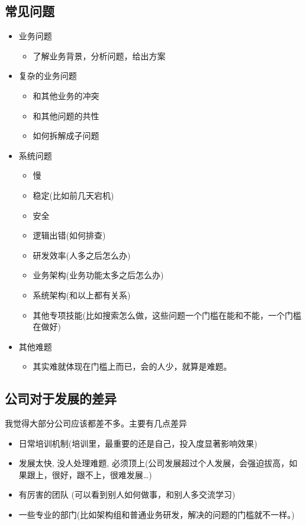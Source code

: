 \documentclass[11pt,a4paper]{article}
\begin{document}
\subsection{常见问题}
\label{sec:org972ca76}
\begin{itemize}
\item 业务问题
\begin{itemize}
\item 了解业务背景，分析问题，给出方案
\end{itemize}
\item 复杂的业务问题
\begin{itemize}
\item 和其他业务的冲突
\item 和其他问题的共性
\item 如何拆解成子问题
\end{itemize}
\item 系统问题
\begin{itemize}
\item 慢
\item 稳定(比如前几天宕机)
\item 安全
\item 逻辑出错(如何排查)
\item 研发效率(人多之后怎么办)
\item 业务架构(业务功能太多之后怎么办)
\item 系统架构(和以上都有关系)
\item 其他专项技能(比如搜索怎么做，这些问题一个门槛在能和不能，一个门槛在做好)
\end{itemize}
\item 其他难题
\begin{itemize}
\item 其实难就体现在门槛上而已，会的人少，就算是难题。
\end{itemize}
\end{itemize}

\subsection{公司对于发展的差异}
\label{sec:org73a642c}
我觉得大部分公司应该都差不多。主要有几点差异
\begin{itemize}
\item 日常培训机制(培训里，最重要的还是自己，投入度显著影响效果)
\item 发展太快, 没人处理难题, 必须顶上(公司发展超过个人发展，会强迫拔高，如果跟上，很好，跟不上，很难发展\ldots{})
\item 有厉害的团队 (可以看到别人如何做事，和别人多交流学习)
\item 一些专业的部门(比如架构组和普通业务研发，解决的问题的门槛就不一样。)
\end{itemize}
\end{document}

